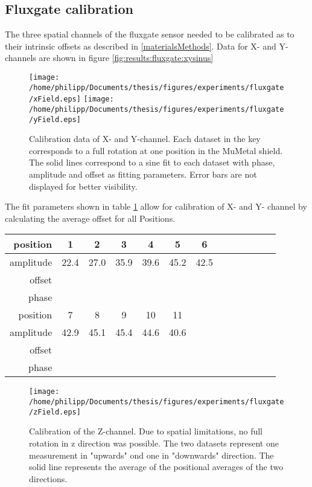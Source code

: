     \subsection{Fluxgate calibration}
    The three spatial channels of the fluxgate sensor needed to be calibrated as to their intrinsic offsets as described in \ref{materialsMethods}. Data for X- and Y-channels are shown in figure \ref{fig:results:fluxgate:xysinus}
        \begin{figure}[h]
            \label{fig:results:fluxgate:ysinus}
            \centering
            \texttt{[image: /home/philipp/Documents/thesis/figures/experiments/fluxgate/xField.eps]}
            \texttt{[image: /home/philipp/Documents/thesis/figures/experiments/fluxgate/yField.eps]}
            \caption{Calibration data of X- and Y-channel. Each dataset in the key corresponds to a full rotation at one position in the MuMetal shield. The solid lines correspond to a sine fit to each dataset with phase, amplitude and offset as fitting parameters. Error bars are not displayed for better visibility.}
        \end{figure}
        The fit parameters shown in table \ref{table:results:calibrationFitParams} allow for calibration of X- and Y- channel by calculating the average offset for all Positions.
        \begin{table}
            \centering
            \label{table:results:calibrationFitParams}
            \begin{tabular}{r|cccccccccccc}
                \label{table:results:calibrationFitParams}
                position & 1& 2 & 3 & 4 & 5 & 6\\
                \hline
                amplitude & 22.4 & 27.0 & 35.9 & 39.6 & 45.2 & 42.5\\ 
                offset \\
                phase \\
                \hline
                position & 7 & 8 & 9 & 10 & 11 \\
                \hline
                amplitude & 42.9 & 45.1 & 45.4 & 44.6 & 40.6\\
                offset \\
                phase
            \end{tabular}
        \end{table}
        \begin{figure}[h]
            \label{fig:results:fluxgate:zcal}
            \centering
            \texttt{[image: /home/philipp/Documents/thesis/figures/experiments/fluxgate/zField.eps]}
            \caption{Calibration of the Z-channel. Due to spatial limitations, no full rotation in z direction was possible. The two datasets represent one measurement in "upwards" ond one in "downwards" direction. The solid line represents the average of the positional averages of the two directions.}
        \end{figure}
